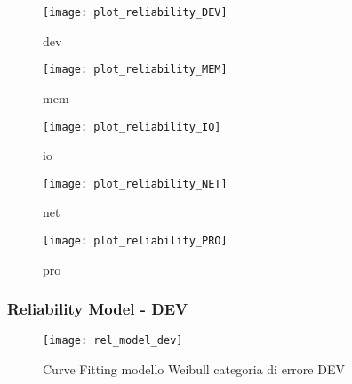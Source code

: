 \begin{minipage}{\linewidth}
  \centering
  \begin{minipage}{0.49\linewidth}
    \begin{figure}[H]
      \texttt{[image: plot\_reliability\_DEV]}
      \caption*{dev}
    \end{figure}
  \end{minipage}
  \begin{minipage}{0.49\linewidth}
    \begin{figure}[H]
      \texttt{[image: plot\_reliability\_MEM]}
      \caption*{mem}
    \end{figure}
  \end{minipage}
  \begin{minipage}{0.49\linewidth}
    \begin{figure}[H]
      \texttt{[image: plot\_reliability\_IO]}
      \caption*{io}
    \end{figure}
  \end{minipage}
  \begin{minipage}{0.49\linewidth}
    \begin{figure}[H]
      \texttt{[image: plot\_reliability\_NET]}
      \caption*{net}
    \end{figure}
  \end{minipage}
  \begin{minipage}{0.49\linewidth}
    \hspace{0.25\linewidth}
    \begin{figure}[H]
      \texttt{[image: plot\_reliability\_PRO]}
      \caption*{pro}
    \end{figure}
  \end{minipage}
\end{minipage}
\label{ffda_modello_reliability_e}

\clearpage

\subsubsection*{Reliability Model - DEV}

\begin{figure}[!htbp]
  \centering
  \texttt{[image: rel\_model\_dev]}
  \caption{Curve Fitting modello Weibull categoria di errore DEV}
  \label{ffda_rel_model_dev}
\end{figure}

